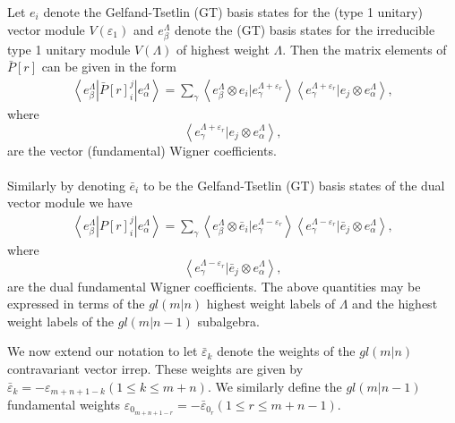 \documentclass[12pt]{article}
\begin{document}
Let $e_i$ denote the Gelfand-Tsetlin (GT) basis states for the (type 1 unitary) vector module $V(\varepsilon_1)$ and ${e^\Lambda_\beta}$ denote the (GT) basis states for the irreducible type 1 unitary module $V(\Lambda)$ of highest weight $\Lambda$. Then the matrix elements of $\bar{P}[r]$ can be given in the form
\begin{align}
\left\langle e^\Lambda_\beta | \bar{P}[r]^j_i | e^{\Lambda}_\alpha \right\rangle =
\sum_\gamma \left\langle e^\Lambda_\beta \otimes e_i | e^{\Lambda + \varepsilon_r}_\gamma \right\rangle
\left\langle e^{\Lambda+\varepsilon_r}_\gamma | e_j \otimes e^\Lambda_\alpha \right\rangle, \label{BarPij}
\end{align}
where
$$
\left\langle e^{\Lambda+\varepsilon_r}_\gamma | e_j \otimes e^\Lambda_\alpha \right\rangle,
$$
are the vector (fundamental) Wigner coefficients.
~~\\
~~\\
Similarly by denoting $\bar{e}_i$ to be the Gelfand-Tsetlin (GT) basis states of the dual vector module we have 
\begin{align}
\left\langle e^\Lambda_\beta | P[r]^j_i | e^{\Lambda}_\alpha \right\rangle =
\sum_\gamma \left\langle e^\Lambda_\beta \otimes \bar{e}_i | e^{\Lambda - \varepsilon_r}_\gamma \right\rangle
\left\langle e^{\Lambda-\varepsilon_r}_\gamma | \bar{e}_j \otimes e^\Lambda_\alpha \right\rangle, \label{Pij}
\end{align}
where
$$
\left\langle e^{\Lambda-\varepsilon_r}_\gamma | \bar{e}_j \otimes e^\Lambda_\alpha \right\rangle,
$$
are the dual fundamental Wigner coefficients. The above quantities may be expressed in terms of the $gl(m|n)$ highest weight labels of $\Lambda$ and the highest weight labels of the $gl(m|n-1)$ subalgebra.

We now extend our notation to let $\bar{\varepsilon}_k$ denote the weights of the $gl(m|n)$ contravariant vector irrep. These weights are given by $\bar{\varepsilon}_k = -\varepsilon_{m+n+1-k} (1 \leq k \leq m+n)$. We similarly define the $gl(m|n-1)$ fundamental weights 
$\varepsilon_{0_{m+n+1-r}} = - \bar{\varepsilon}_{0_r} (1 \leq r \leq m+n-1) $.
\end{document}
